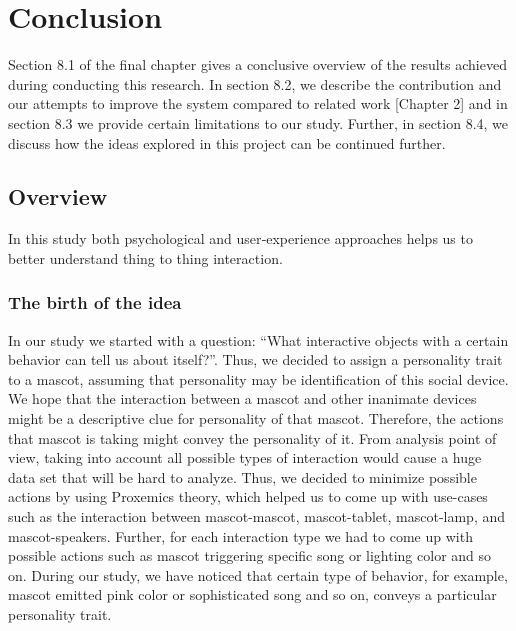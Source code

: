 \chapter{Conclusion}
Section 8.1 of the final chapter gives a conclusive overview of the results achieved during conducting this research. In section 8.2, we describe the contribution and our attempts to improve the system compared to related work [Chapter 2] and in section 8.3 we provide certain limitations to our study. Further, in section 8.4, we discuss how the ideas explored in this project can be continued further.
\section{Overview}
In this study both psychological and user‐experience approaches helps us to better understand thing to thing interaction. 
\subsection{The birth of the idea}
In our study we started with a question: “What interactive objects with a certain behavior can tell us about itself?”. Thus, we decided to assign a personality trait to a mascot, assuming that personality may be identification of this social device. We hope that the interaction between a mascot and other inanimate devices might be a descriptive clue for personality of that mascot. Therefore, the actions that mascot is taking might convey the personality of it. From analysis point of view, taking into account all possible types of interaction would cause a huge data set that will be hard to analyze. Thus, we decided to minimize possible actions by using Proxemics theory, which helped us to come up with use-cases such as the interaction between mascot-mascot, mascot-tablet, mascot-lamp, and mascot-speakers. Further, for each interaction type we had to come up with possible actions such as mascot triggering specific song or lighting color and so on. During our study, we have noticed that certain type of behavior, for example, mascot emitted pink color or sophisticated song and so on, conveys a particular personality trait.
